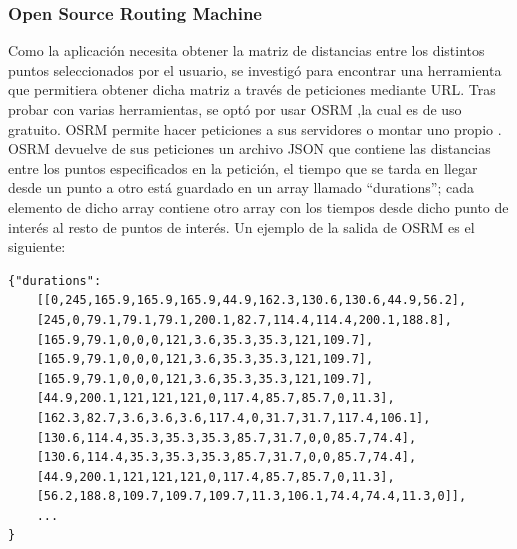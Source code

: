 \subsubsection[OSRM]{Open Source Routing Machine}
Como la aplicación necesita obtener la matriz de distancias entre los distintos puntos seleccionados por el usuario, se investigó para encontrar una herramienta que permitiera obtener dicha matriz a través de peticiones mediante URL.\newline
Tras probar con varias herramientas, se optó por usar OSRM \cite{osmr},la cual es de uso gratuito. OSRM permite hacer peticiones a sus servidores\cite{osmr_doc} o montar uno propio \cite{osmr_backend}.\newline
OSRM devuelve de sus peticiones un archivo JSON que contiene las distancias entre los puntos especificados en la petición, el tiempo que se tarda en llegar desde un punto a otro está guardado en un array llamado \enquote{durations}; cada elemento de dicho array contiene otro array con los tiempos desde dicho punto de interés al resto de puntos de interés. Un ejemplo de la salida de OSRM es el siguiente:
\begin{lstlisting}[caption=Salida de OSRM]
{"durations":
	[[0,245,165.9,165.9,165.9,44.9,162.3,130.6,130.6,44.9,56.2],
	[245,0,79.1,79.1,79.1,200.1,82.7,114.4,114.4,200.1,188.8],
	[165.9,79.1,0,0,0,121,3.6,35.3,35.3,121,109.7],
	[165.9,79.1,0,0,0,121,3.6,35.3,35.3,121,109.7],
	[165.9,79.1,0,0,0,121,3.6,35.3,35.3,121,109.7],
	[44.9,200.1,121,121,121,0,117.4,85.7,85.7,0,11.3],
	[162.3,82.7,3.6,3.6,3.6,117.4,0,31.7,31.7,117.4,106.1],
	[130.6,114.4,35.3,35.3,35.3,85.7,31.7,0,0,85.7,74.4],
	[130.6,114.4,35.3,35.3,35.3,85.7,31.7,0,0,85.7,74.4],
	[44.9,200.1,121,121,121,0,117.4,85.7,85.7,0,11.3],
	[56.2,188.8,109.7,109.7,109.7,11.3,106.1,74.4,74.4,11.3,0]],
	...
}
\end{lstlisting}

